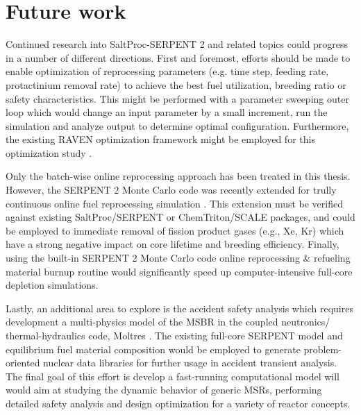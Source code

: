 \section{Future work}
Continued research into SaltProc-SERPENT 2 and related topics could progress in a number of different directions. First and foremost, efforts should be made to enable optimization of reprocessing parameters (e.g. time step, feeding rate, protactinium removal rate) to achieve the best fuel utilization, breeding ratio or safety characteristics. This might be performed with a parameter sweeping outer loop which would change an input parameter by a small increment, run the simulation and analyze output to determine optimal configuration. Furthermore, the existing RAVEN optimization framework might be employed for this optimization study \cite{alfonsi_raven_2013}.

Only the batch-wise online reprocessing approach has been treated in this thesis. However, the SERPENT 2 Monte Carlo code was recently extended for trully continuous online fuel reprocessing simulation \cite{aufiero_extended_2013}. This extension must be verified against existing SaltProc/SERPENT or ChemTriton/SCALE packages, and could be employed to immediate removal of fission product gases (e.g., Xe, Kr) which have a strong negative impact on core lifetime and breeding efficiency. Finally, using the built-in SERPENT 2 Monte Carlo code online reprocessing \& refueling material burnup routine would significantly speed up computer-intensive full-core depletion simulations.

Lastly, an additional area to explore is the accident safety analysis which requires development a multi-physics model of the \gls{MSBR} in the coupled neutronics/ thermal-hydraulics code, Moltres \cite{lindsay_introduction_2018}. The existing full-core SERPENT model and equilibrium fuel material composition would be employed to generate problem-oriented nuclear data libraries for further usage in accident transient analysis. The final goal of this effort is develop a fast-running computational model will would aim at studying the dynamic behavior of generic \glspl{MSR}, performing detailed safety analysis and design optimization for a variety of reactor concepts.


